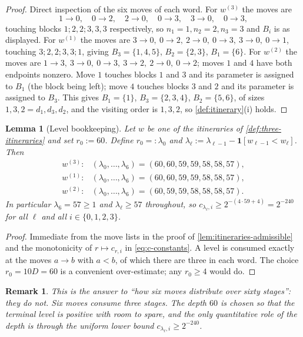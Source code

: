 \documentclass[11pt]{article}
\newtheorem{lemma}[theorem]{Lemma}
\newtheorem{remark}[theorem]{Remark}
\newcommand{\one}{\mathbf{1}}
\newcommand{\Idx}{\{0,1,2,3\}}
\begin{document}
\begin{proof}
  Direct inspection of the six moves of each word.  For $w^{(3)}$ the moves are
  \[
    1\to0,\quad 0\to2,\quad 2\to0,\quad 0\to3,\quad 3\to0,\quad 0\to3,
  \]
  touching blocks $1;2,2;3,3,3$ respectively, so $n_1=1,n_2=2,n_3=3$ and
  $B_i$ is as displayed.  For $w^{(1)}$ the moves are
  $3\to0,\ 0\to2,\ 2\to0,\ 0\to3,\ 3\to0,\ 0\to1$, touching
  $3;2,2;3,3;1$, giving $B_3=\{1,4,5\}$, $B_2=\{2,3\}$, $B_1=\{6\}$.
  For $w^{(2)}$ the moves are
  $1\to3,\ 3\to0,\ 0\to3,\ 3\to2,\ 2\to0,\ 0\to2$; moves $1$ and $4$ have both
  endpoints nonzero.  Move $1$ touches blocks $1$ and $3$ and its parameter is
  assigned to $B_1$ (the block being left); move $4$ touches blocks $3$ and $2$
  and its parameter is assigned to $B_3$.  This gives $B_1=\{1\}$,
  $B_3=\{2,3,4\}$, $B_2=\{5,6\}$, of sizes $1,3,2=d_1,d_3,d_2$, and the visiting
  order is $1,3,2$, so \cref{def:itinerary}(i) holds.
\end{proof}

\begin{lemma}[Level bookkeeping]
  \label{lem:levels}
  Let $w$ be one of the itineraries of \cref{def:three-itineraries} and set
  $r_0:=60$.  Define $r_0=:\lambda_0$ and
  $\lambda_\ell:=\lambda_{\ell-1}-\one[w_{\ell-1}<w_\ell]$.  Then
  \[
    \begin{array}{ll}
      w^{(3)}: & (\lambda_0,\dots,\lambda_6)=(60,60,59,59,58,58,57),\\
      w^{(1)}: & (\lambda_0,\dots,\lambda_6)=(60,60,59,59,58,58,57),\\
      w^{(2)}: & (\lambda_0,\dots,\lambda_6)=(60,59,59,58,58,58,57).
    \end{array}
  \]
  In particular $\lambda_6=57\geq1$ and $\lambda_\ell\geq 57$ throughout, so
  $c_{\lambda_\ell,i}\geq2^{-(4\cdot59+4)}=2^{-240}$ for all $\ell$ and all
  $i\in\Idx$.
\end{lemma}

\begin{proof}
  Immediate from the move lists in the proof of
  \cref{lem:itineraries-admissible} and the monotonicity of
  $r\mapsto c_{r,i}$ in \eqref{eq:c-constants}.  A level is consumed exactly at
  the moves $a\to b$ with $a<b$, of which there are three in each word.  The
  choice $r_0=10D=60$ is a convenient over-estimate; any $r_0\geq4$ would do.
\end{proof}

\begin{remark}
  This is the answer to ``how six moves distribute over sixty stages'': they do
  not.  Six moves consume three stages.  The depth $60$ is chosen so that the
  terminal level is positive with room to spare, and the only quantitative role of
  the depth is through the uniform lower bound $c_{\lambda_\ell,i}\geq2^{-240}$.
\end{remark}
\end{document}
